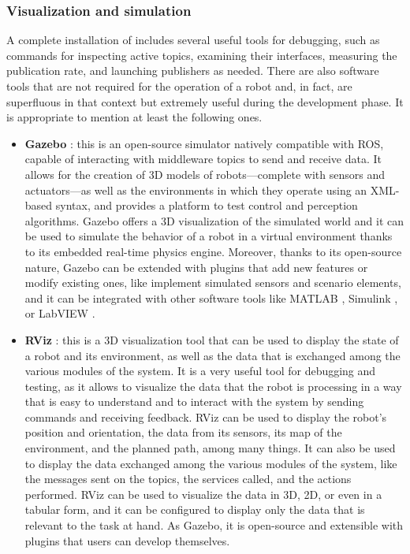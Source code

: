\subsubsection{Visualization and simulation}
\label{sec:ros2_sim}
A complete installation of \ROS includes several useful tools for debugging, such as commands for inspecting active topics, examining their interfaces, measuring the publication rate, and launching publishers as needed. There are also software tools that are not required for the operation of a robot and, in fact, are superfluous in that context but extremely useful during the development phase. It is appropriate to mention at least the following ones.
\begin{itemize}
  \item \textbf{Gazebo} \cite{open_robotics_gazebo_nodate}: this is an open-source simulator natively compatible with ROS, capable of interacting with middleware topics to send and receive data. It allows for the creation of 3D models of robots—complete with sensors and actuators—as well as the environments in which they operate using an XML-based syntax, and provides a platform to test control and perception algorithms. Gazebo offers a 3D visualization of the simulated world and it can be used to simulate the behavior of a robot in a virtual environment thanks to its embedded real-time physics engine. Moreover, thanks to its open-source nature, Gazebo can be extended with plugins that add new features or modify existing ones, like implement simulated sensors and scenario elements, and it can be integrated with other software tools like MATLAB \cite{mathworks_matlab_nodate}, Simulink \cite{mathworks_simulink_nodate}, or LabVIEW \cite{national_instruments_labview_nodate}.
  \item \textbf{RViz} \cite{open_robotics_rviz_nodate}: this is a 3D visualization tool that can be used to display the state of a robot and its environment, as well as the data that is exchanged among the various modules of the system. It is a very useful tool for debugging and testing, as it allows to visualize the data that the robot is processing in a way that is easy to understand and to interact with the system by sending commands and receiving feedback. RViz can be used to display the robot's position and orientation, the data from its sensors, its map of the environment, and the planned path, among many things. It can also be used to display the data exchanged among the various modules of the system, like the messages sent on the topics, the services called, and the actions performed. RViz can be used to visualize the data in 3D, 2D, or even in a tabular form, and it can be configured to display only the data that is relevant to the task at hand. As Gazebo, it is open-source and extensible with plugins that users can develop themselves.
\end{itemize}
